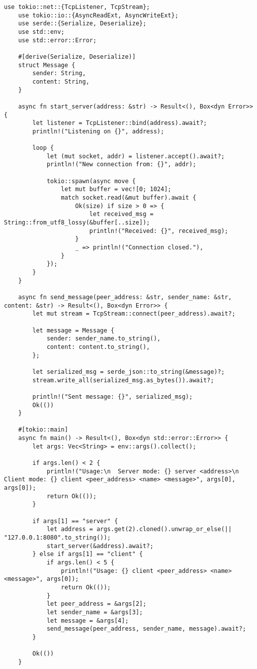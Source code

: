 \begin{lstlisting}[style=RustStyle]
	use tokio::net::{TcpListener, TcpStream};
	use tokio::io::{AsyncReadExt, AsyncWriteExt};
	use serde::{Serialize, Deserialize};
	use std::env;
	use std::error::Error;
	
	#[derive(Serialize, Deserialize)]
	struct Message {
		sender: String,
		content: String,
	}
	
	async fn start_server(address: &str) -> Result<(), Box<dyn Error>> {
		let listener = TcpListener::bind(address).await?;
		println!("Listening on {}", address);
		
		loop {
			let (mut socket, addr) = listener.accept().await?;
			println!("New connection from: {}", addr);
			
			tokio::spawn(async move {
				let mut buffer = vec![0; 1024];
				match socket.read(&mut buffer).await {
					Ok(size) if size > 0 => {
						let received_msg = String::from_utf8_lossy(&buffer[..size]);
						println!("Received: {}", received_msg);
					}
					_ => println!("Connection closed."),
				}
			});
		}
	}
	
	async fn send_message(peer_address: &str, sender_name: &str, content: &str) -> Result<(), Box<dyn Error>> {
		let mut stream = TcpStream::connect(peer_address).await?;
		
		let message = Message {
			sender: sender_name.to_string(),
			content: content.to_string(),
		};
		
		let serialized_msg = serde_json::to_string(&message)?;
		stream.write_all(serialized_msg.as_bytes()).await?;
		
		println!("Sent message: {}", serialized_msg);
		Ok(())
	}
	
	#[tokio::main]
	async fn main() -> Result<(), Box<dyn std::error::Error>> {
		let args: Vec<String> = env::args().collect();
		
		if args.len() < 2 {
			println!("Usage:\n  Server mode: {} server <address>\n  Client mode: {} client <peer_address> <name> <message>", args[0], args[0]);
			return Ok(());
		}
		
		if args[1] == "server" {
			let address = args.get(2).cloned().unwrap_or_else(|| "127.0.0.1:8080".to_string());
			start_server(&address).await?;
		} else if args[1] == "client" {
			if args.len() < 5 {
				println!("Usage: {} client <peer_address> <name> <message>", args[0]);
				return Ok(());
			}
			let peer_address = &args[2];
			let sender_name = &args[3];
			let message = &args[4];
			send_message(peer_address, sender_name, message).await?;
		}
		
		Ok(())
	}
\end{lstlisting}

